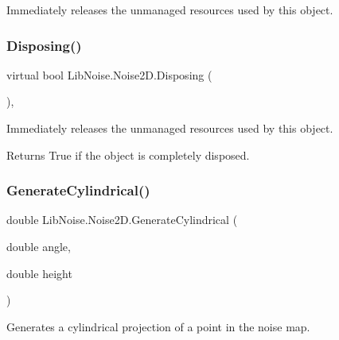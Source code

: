 Immediately releases the unmanaged resources used by this object. 

\mbox{\label{class_lib_noise_1_1_noise2_d_a937c13bf6b73e1e9b85e499f97bd1eb2}} 
\subsubsection{\texorpdfstring{Disposing()}{Disposing()}}
{\footnotesize\ttfamily virtual bool Lib\+Noise.\+Noise2\+D.\+Disposing (\begin{DoxyParamCaption}{ }\end{DoxyParamCaption})\hspace{0.3cm}{\ttfamily [protected]}, {\ttfamily [virtual]}}



Immediately releases the unmanaged resources used by this object. 

\begin{DoxyReturn}{Returns}
True if the object is completely disposed.
\end{DoxyReturn}
\mbox{\label{class_lib_noise_1_1_noise2_d_a7507549314e864809cf5deb036decd7f}} 
\subsubsection{\texorpdfstring{Generate\+Cylindrical()}{GenerateCylindrical()}\hspace{0.1cm}{\footnotesize\ttfamily [1/2]}}
{\footnotesize\ttfamily double Lib\+Noise.\+Noise2\+D.\+Generate\+Cylindrical (\begin{DoxyParamCaption}\item[{double}]{angle,  }\item[{double}]{height }\end{DoxyParamCaption})\hspace{0.3cm}{\ttfamily [private]}}



Generates a cylindrical projection of a point in the noise map. 


